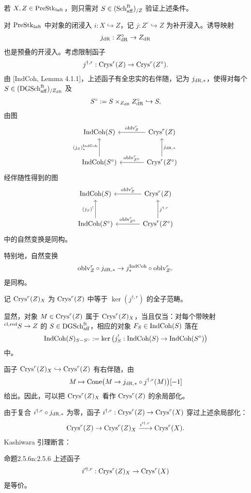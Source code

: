 若 $X,Z\in\mathrm{PreStk}_{\mathrm{laft}}$，则只需对 $S\in(\mathrm{Sch}_{\mathrm{aff}}^{\mathrm{ft}})_{/Z}$ 验证上述条件。

对 $\mathrm{PreStk}_{\mathrm{laft}}$ 中对象的闭浸入 $i:X\hookrightarrow Z$，记 $j:Z^{\circ}\hookrightarrow Z$ 为补开浸入。诱导映射
\[
j_{\mathrm{dR}}:Z^{\circ}_{\mathrm{dR}}\to Z_{\mathrm{dR}}
\]
也是预叠的开浸入。考虑限制函子
\[
j^{\dagger,r}:\mathrm{Crys}^r(Z)\to\mathrm{Crys}^r(Z^{\circ}).
\]
由 [IndCoh, Lemma 4.1.1]，上述函子有全忠实的右伴随，记为 $j_{\mathrm{dR},*}$，使得对每个 $S\in(\mathrm{DGSch}_{\mathrm{aff}}^{\mathrm{ft}})_{/Z_{\mathrm{dR}}}$ 及
\[
S^{\circ}:=S\times_{Z_{\mathrm{dR}}}Z^{\circ}_{\mathrm{dR}}\hookrightarrow S,
\]
由图
\[
\begin{tikzcd}[column sep=large, row sep=large]
 \IndCoh(S) & \Crys^r(Z) \arrow[l, "\oblv^r_Z"'] \\
 \IndCoh(S^{\circ}) \arrow[u, "(j_S)_*^{\IndCoh}"] & \Crys^r(Z^{\circ}) \arrow[l, "\oblv^r_{Z^{\circ}}"'] \arrow[u, "j_{\dR,*}"']
\end{tikzcd}
\]
经伴随性得到的图
\[
\begin{tikzcd}[column sep=large, row sep=large]
 \IndCoh(S) & \Crys^r(Z) \arrow[l, "\oblv^r_Z"'] \\
 \IndCoh(S^{\circ}) \arrow[u, "(j_S)^!"] & \Crys^r(Z^{\circ}) \arrow[l, "\oblv^r_{Z^{\circ}}"'] \arrow[u, "j^{\dagger,r}"']
\end{tikzcd}
\]
中的自然变换是同构。

特别地，自然变换
\[
\mathrm{oblv}^r_Z\circ j_{\mathrm{dR},*}\to j_*^{\mathrm{IndCoh}}\circ\mathrm{oblv}^r_{Z^{\circ}}
\]
是同构。

记 $\mathrm{Crys}^r(Z)_X$ 为 $\mathrm{Crys}^r(Z)$ 中等于 $\ker(j^{\dagger,r})$ 的全子范畴。

显然，对象 $M\in\mathrm{Crys}^r(Z)$ 属于 $\mathrm{Crys}^r(Z)_X$，当且仅当：对每个带映射 $^{\mathrm{cl,red}} S\to Z$ 的 $S\in\mathrm{DGSch}_{\mathrm{aff}}^{\mathrm{ft}}$，相应的对象 $F_S\in\mathrm{IndCoh}(S)$ 落在
\[
\mathrm{IndCoh}(S)_{S-S^{\circ}}:=\ker\big(j_S^!:\mathrm{IndCoh}(S)\to\mathrm{IndCoh}(S^{\circ})\big)
\]
中。

函子 $\mathrm{Crys}^r(Z)_X\hookrightarrow\mathrm{Crys}^r(Z)$ 有右伴随，由
\[
M\mapsto\mathrm{Cone}\big(M\to j_{\mathrm{dR},*}\circ j^{\dagger,r}(M)\big)[-1]
\]
给出。因此，可以把 $\mathrm{Crys}^r(Z)_X$ 看作 $\mathrm{Crys}^r(Z)$ 的余局部化。

由于复合 $i^{\dagger,r}\circ j_{\mathrm{dR},*}$ 为零，函子 $i^{\dagger,r}:\mathrm{Crys}^r(Z)\to\mathrm{Crys}^r(X)$ 穿过上述余局部化：
\[
\mathrm{Crys}^r(Z)\to\mathrm{Crys}^r(Z)_X\xrightarrow{i'^{\dagger,r}}\mathrm{Crys}^r(X).
\]
Kashiwara 引理断言：

\begin{othm}{命题}{2.5.6}{n:2.5.6}
上述函子
\[
i'^{\dagger,r}:\mathrm{Crys}^r(Z)_X\to\mathrm{Crys}^r(X)
\]
是等价。
\end{othm}

